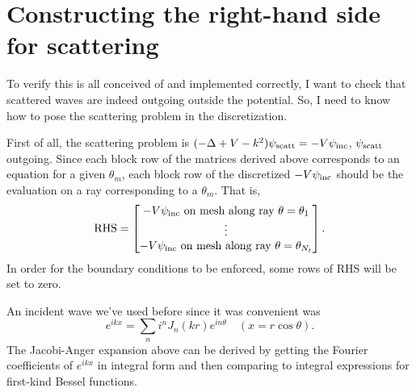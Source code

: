 \section{Constructing the right-hand side for scattering}
\label{sec-RHS}

To verify this is all conceived of and implemented correctly,
I want to check that scattered waves are indeed outgoing outside
the potential. So, I need to know how to pose the scattering
problem in the discretization.

First of all, the scattering problem is
$(-\Delta + V - k^2)\psi_{\text{scatt}} = -V\psi_{\text{inc}}$, $\psi_{\text{scatt}}$
outgoing. Since each block row of the matrices derived above
corresponds to an equation for a given $\theta_m$, each block
row of the discretized $-V\psi_{\text{inc}}$ should be the evaluation
on a ray corresponding to a $\theta_m$. That is,
\[
 \text{RHS} =
 \begin{bmatrix}
  -V\psi_{\text{inc}} \text{ on mesh along ray }\theta = \theta_1 \\
  \vdots \\
  -V\psi_{\text{inc}} \text{ on mesh along ray }\theta = \theta_{N_t}
 \end{bmatrix}.
\]
In order for the boundary conditions to
be enforced, some rows of RHS will be set to zero.

An incident wave we've used before since it was convenient was
\[
 e^{ikx} = \sum_n i^n J_n(kr) e^{in\theta} \quad (x = r\cos\theta).
\]
The Jacobi-Anger expansion above can be derived 
by getting the Fourier coefficients of $e^{ikx}$
in integral form and then comparing to integral expressions for
first-kind Bessel functions.
